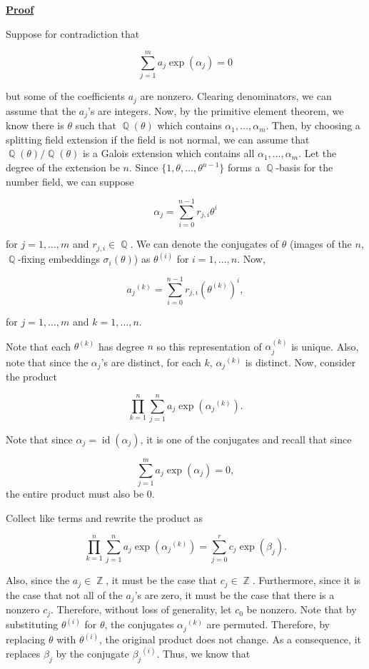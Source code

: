 \documentclass[a4paper, 11pt]{book}
\newcommand{\proof}{\underline{\textbf{Proof}} }
\DeclareMathOperator{\id}{id}
\DeclareMathOperator{\Q}{\mathbb{Q}}
\DeclareMathOperator{\Z}{\mathbb{Z}}
\begin{document}
\proof{Suppose for contradiction that 

    \[\sum\limits_{j=1}^{m} a_j\exp(\alpha_j) = 0\] 

    but some of the coefficients $a_j$ are nonzero. Clearing denominators, we can assume that the $a_j$'s are integers. Now, by the primitive element theorem, we know there is $\theta$ such that $\Q(\theta)$ which contains $\alpha_1, \ldots, \alpha_m$. Then, by choosing a splitting field extension if the field is not normal, we can assume that $\Q(\theta)/\Q(\theta)$ is a Galois extension which contains all $\alpha_1, \ldots, \alpha_m$. Let the degree of the extension be $n$. Since $\{1, \theta, \ldots, \theta^{n-1}\}$ forms a $\Q$-basis for the number field, we can suppose 

    \[\alpha_j = \sum\limits_{i=0}^{n-1} r_{j,i}\theta^{i}\]

    for $j = 1, \ldots, m$ and $r_{j,i} \in \Q$. We can denote the conjugates of $\theta$ (images of the $n$, $\Q$-fixing embeddings $\sigma_{i}(\theta)$) as $\theta^{(i)}$ for $i = 1, \ldots, n$. Now, 

    \[{a_j}^{(k)} = \sum\limits_{i=0}^{n-1}r_{j,i}{\left(\theta^{(k)}\right)}^{i},\]
    
    for $j = 1,\ldots, m$ and $k = 1,\ldots, n$.

    Note that each $\theta^{(k)}$ has degree $n$ so this representation of $\alpha_j^{(k)}$ is unique. Also, note that since the $\alpha_j$'s are distinct, for each $k$, ${\alpha_j}^{(k)}$ is distinct. Now, consider the product 

    \[\prod\limits_{k=1}^{n} \sum\limits_{j=1}^{n} a_j \exp({\alpha_j}^{(k)}).\]

    Note that since $\alpha_j = \id(\alpha_j)$, it is one of the conjugates and recall that since 

    \[\sum\limits_{j=1}^{m} a_j\exp(\alpha_j) = 0,\] the entire product must also be $0$.\par

    Collect like terms and rewrite the product as 

    \[\prod\limits_{k=1}^{n} \sum\limits_{j=1}^{n} a_j \exp({\alpha_j}^{(k)}) = \sum\limits_{j=0}^{r} c_j \exp(\beta_j).\] 

    Also, since the $a_j \in \Z$, it must be the case that $c_j \in \Z$. Furthermore, since it is the case that not all of the $a_j$'s are zero, it must be the case that there is a nonzero $c_j$. Therefore, without loss of generality, let $c_0$ be nonzero. Note that by substituting $\theta^{(i)}$ for $\theta$, the conjugates ${\alpha_j}^{(k)}$ are permuted. Therefore, by replacing $\theta$ with $\theta^{(i)}$, the original product does not change. As a consequence, it replaces $\beta_j$ by the conjugate ${\beta_j}^{(i)}$. Thus, we know that 

}
\end{document}
